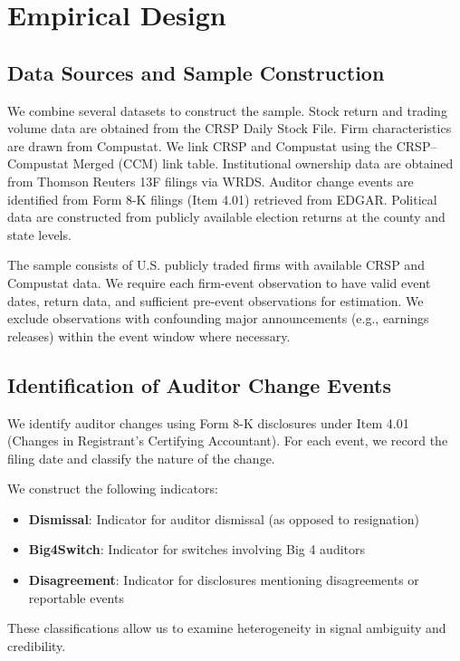 \section{Empirical Design}

\subsection{Data Sources and Sample Construction}

We combine several datasets to construct the sample. Stock return and trading volume data are obtained from the CRSP Daily Stock File. Firm characteristics are drawn from Compustat. We link CRSP and Compustat using the CRSP--Compustat Merged (CCM) link table. Institutional ownership data are obtained from Thomson Reuters 13F filings via WRDS. Auditor change events are identified from Form 8-K filings (Item 4.01) retrieved from EDGAR. Political data are constructed from publicly available election returns at the county and state levels.

The sample consists of U.S. publicly traded firms with available CRSP and Compustat data. We require each firm-event observation to have valid event dates, return data, and sufficient pre-event observations for estimation. We exclude observations with confounding major announcements (e.g., earnings releases) within the event window where necessary.

\subsection{Identification of Auditor Change Events}

We identify auditor changes using Form 8-K disclosures under Item 4.01 (Changes in Registrant’s Certifying Accountant). For each event, we record the filing date and classify the nature of the change.

We construct the following indicators:

\begin{itemize}
    \item \textbf{Dismissal}: Indicator for auditor dismissal (as opposed to resignation)
    \item \textbf{Big4Switch}: Indicator for switches involving Big 4 auditors
    \item \textbf{Disagreement}: Indicator for disclosures mentioning disagreements or reportable events
\end{itemize}

These classifications allow us to examine heterogeneity in signal ambiguity and credibility.

